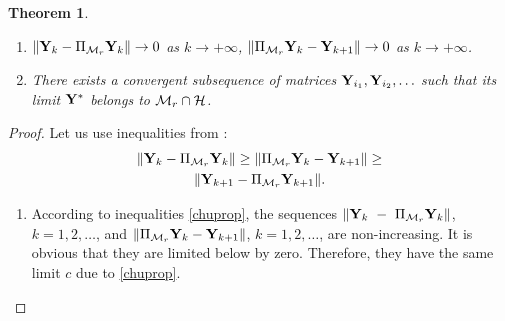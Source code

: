 \documentclass[sii]{ipart}
\newtheorem{theorem}{Theorem}
\begin{document}
\begin{theorem}
	\label{th:converg}
	\begin{enumerate}
		Let the space $\calM_r$ be closed in the topology generated by norm $\|\cdot\|$. Then
		\item $\|\mathbf{Y}_k - \Pi_{\mathcal{M}_r}\mathbf{Y}_k\| \to 0$ as $k \to +\infty$, $\|\Pi_{\mathcal{M}_r}\mathbf{Y}_k - \mathbf{Y}_{k+1}\| \to 0$ as $k \to +\infty$.
		\item There exists a convergent subsequence of matrices $\mathbf{Y}_{i_1}, \mathbf{Y}_{i_2}, \ldots$ such that its limit $\mathbf{Y}^*$ belongs to $\mathcal{M}_r \cap \mathcal{H}$.
	\end{enumerate}
\end{theorem}
\begin{proof}
	Let us use inequalities from \cite[ineq. (4.1)]{Chu.etal2003}:
	\begin{multline}
	\label{chuprop}
	\|\bfY_k - \Pi_{\calM_r} \bfY_k\| \ge \|\Pi_{\calM_r} \bfY_k - \bfY_{k + 1}\| \ge \\ \|\bfY_{k+1} - \Pi_{\calM_r} \bfY_{k + 1}\|.
	\end{multline}
	
	\begin{enumerate}
		\item According to inequalities \eqref{chuprop}, the sequences $\|\mathbf{Y}_k~-~\Pi_{\mathcal{M}_r} \mathbf{Y}_k\|$, $k = 1, 2, \ldots$, and $\|\Pi_{\mathcal{M}_r} \mathbf{Y}_k - \mathbf{Y}_{k + 1}\|$, $k = 1, 2, \ldots$, are non-increasing. It is obvious that they are limited below by zero. Therefore, they have the same limit $c$ due to \eqref{chuprop}.
		

\end{enumerate}
\end{proof}
\end{document}
